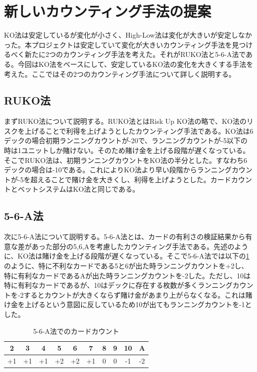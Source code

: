 \section{新しいカウンティング手法の提案}
KO法は安定しているが変化が小さく、High-Low法は変化が大きいが安定しなかった。本プロジェクトは安定していて変化が大きいカウンティング手法を見つけるべく新たに2つのカウンティング手法を考えた。それがRUKO法と5-6-A法である。今回はKO法をベースにして、安定しているKO法の変化を大きくする手法を考えた。ここではその2つのカウンティング手法について詳しく説明する。

\subsection{RUKO法}
まずRUKO法について説明する。RUKO法とはRisk Up KO法の略で、KO法のリスクを上げることで利得を上げようとしたカウンティング手法である。KO法は6デックの場合初期ランニングカウントが-20で、ランニングカウントが-5以下の時は1ユニットしか賭けない。そのため賭け金を上げる段階が遅くなっている。そこでRUKO法は、初期ランニングカウントをKO法の半分とした。すなわち6デックの場合は-10である。これによりKO法より早い段階からランニングカウントが-5を超えることで賭け金を大きくし、利得を上げようとした。カードカウントとベットシステムはKO法と同じである。

\subsection{5-6-A法}
次に5-6-A法について説明する。5-6-A法とは、カードの有利さの検証結果から有意な差があった部分の5,6,Aを考慮したカウンティング手法である。先述のように、KO法は賭け金を上げる段階が遅くなっている。そこで5-6-A法では以下の\ref{56Acount}のように、特に不利なカードである5と6が出た時ランニングカウントを+2し、特に有利なカードであるAが出た時ランニングカウントを-2した。ただし、10は特に有利なカードであるが、10はデックに存在する枚数が多くランニングカウントを-2するとカウントが大きくならず賭け金があまり上がらなくなる。これは賭け金を上げるという意図に反しているため10が出てもランニングカウントを-1とした。

\begin{table}[H]
    \centering
    \label{56Acount}
    \caption{5-6-A法でのカードカウント}
    \begin{tabular}{|c|c|c|c|c|c|c|c|c|c|} \hline
      2&3&4&5&6&7&8&9&10&A \\ \hline
      +1&+1&+1&+2&+2&+1&0&0&-1&-2 \\ \hline
    \end{tabular}
\end{table}

